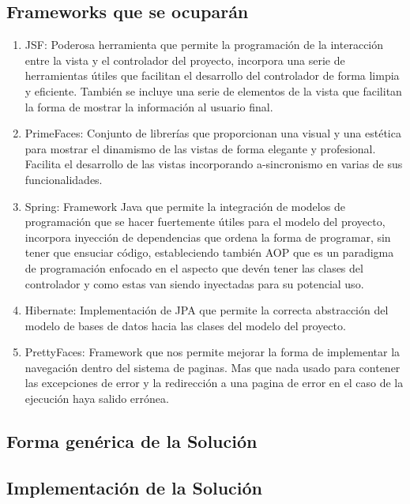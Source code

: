 \documentclass[a4paper,12pt,openany,oneside]{book}
\begin{document}
\subsection{Frameworks que se ocuparán}
\begin{enumerate}
\item JSF: Poderosa herramienta que permite la programación de la interacción entre la vista y el controlador del proyecto, incorpora una serie de herramientas útiles que facilitan el desarrollo del controlador de forma limpia y eficiente. También se incluye una serie de elementos de la vista que facilitan la forma de mostrar la información al usuario final.
\item PrimeFaces: Conjunto de librerías que proporcionan una visual y una estética para mostrar el dinamismo de las vistas de forma elegante y profesional. Facilita el desarrollo de las vistas incorporando a-sincronismo en varias de sus funcionalidades. 
\item Spring: Framework Java que permite la integración de modelos de programación que se hacer fuertemente útiles para el modelo del proyecto, incorpora inyección de dependencias que ordena la forma de programar, sin tener que ensuciar código, estableciendo también AOP que es un paradigma de programación enfocado en el aspecto que devén tener las clases del controlador y como estas van siendo inyectadas para su potencial uso. 
\item Hibernate: Implementación de JPA que permite la correcta abstracción del modelo de bases de datos hacia las clases del modelo del proyecto.
\item PrettyFaces: Framework que nos permite mejorar la forma de implementar la navegación dentro del sistema de paginas. Mas que nada usado para contener las excepciones de error y la redirección a una pagina de error en el caso de la ejecución haya salido errónea.
\end{enumerate}
\subsection{Forma genérica de la Solución}

\subsection{Implementación de la Solución}
\end{document}

